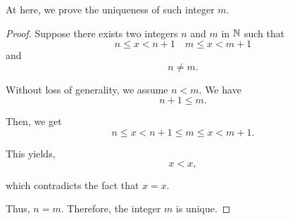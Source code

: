 At here, we prove the uniqueness of such integer $m$. 
\begin{proof}
    Suppose there exists two integers $n$ and $m$ in $\mathbb{N}$ such that 
    \begin{equation*}
        n \leq x < n + 1 \quad m \leq x < m + 1
    \end{equation*}
    and 
    \begin{equation*}
        n \neq m. 
    \end{equation*}

    Without loss of generality, we assume $n < m$. We have 
    \begin{equation*}
        n + 1 \leq m. 
    \end{equation*}

    Then, we get 
    \begin{equation*}
        n \leq x < n + 1 \leq m \leq x < m + 1. 
    \end{equation*}

    This yields, 
    \begin{equation*}
        x < x,  
    \end{equation*}

    which contradicts the fact that $x = x$. 

    Thus, $n = m$. 
    Therefore, the integer $m$ is unique. 
\end{proof}

\newpage
